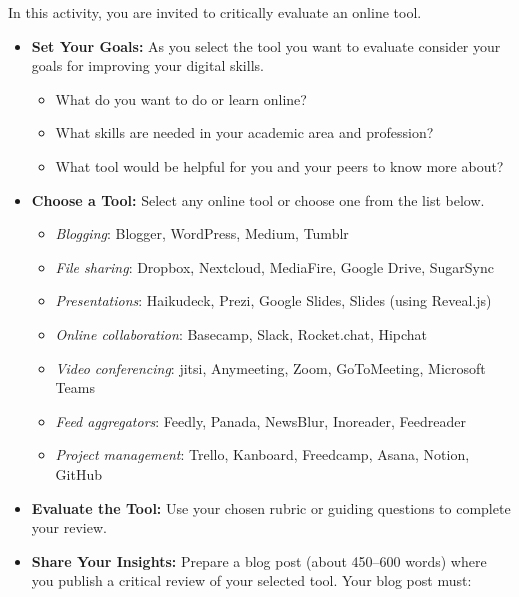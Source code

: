 \documentclass[
  letterpaper,
  DIV=11,
  numbers=noendperiod]{scrreprt}
\providecommand{\tightlist}{%
  \setlength{\itemsep}{0pt}\setlength{\parskip}{0pt}}\usepackage{longtable,booktabs,array}
\begin{document}
\begin{tcolorbox}[enhanced jigsaw, toprule=.15mm, colback=white, colframe=quarto-callout-note-color-frame, bottomtitle=1mm, leftrule=.75mm, coltitle=black, titlerule=0mm, rightrule=.15mm, colbacktitle=quarto-callout-note-color!10!white, left=2mm, title={Learning Activity}, opacitybacktitle=0.6, opacityback=0, breakable, toptitle=1mm, arc=.35mm, bottomrule=.15mm]

In this activity, you are invited to critically evaluate an online tool.

\begin{itemize}
\tightlist
\item
  \textbf{Set Your Goals:} As you select the tool you want to evaluate
  consider your goals for improving your digital skills.

  \begin{itemize}
  \tightlist
  \item
    What do you want to do or learn online?
  \item
    What skills are needed in your academic area and profession?
  \item
    What tool would be helpful for you and your peers to know more
    about?
  \end{itemize}
\item
  \textbf{Choose a Tool:} Select any online tool or choose one from the
  list below.

  \begin{itemize}
  \tightlist
  \item
    \emph{Blogging}: Blogger, WordPress, Medium, Tumblr
  \item
    \emph{File sharing}: Dropbox, Nextcloud, MediaFire, Google Drive,
    SugarSync
  \item
    \emph{Presentations}: Haikudeck, Prezi, Google Slides, Slides (using
    Reveal.js)
  \item
    \emph{Online collaboration}: Basecamp, Slack, Rocket.chat, Hipchat
  \item
    \emph{Video conferencing}: jitsi, Anymeeting, Zoom, GoToMeeting,
    Microsoft Teams
  \item
    \emph{Feed aggregators}: Feedly, Panada, NewsBlur, Inoreader,
    Feedreader
  \item
    \emph{Project management}: Trello, Kanboard, Freedcamp, Asana,
    Notion, GitHub
  \end{itemize}
\item
  \textbf{Evaluate the Tool:} Use your chosen rubric or guiding
  questions to complete your review.
\item
  \textbf{Share Your Insights:} Prepare a blog post (about 450--600
  words) where you publish a critical review of your selected tool. Your
  blog post must:


\end{itemize}
\end{tcolorbox}
\end{document}
